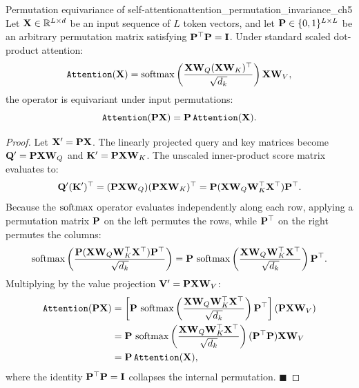 \documentclass[../../../main.tex]{subfiles}
\begin{document}
\begin{theorem}{Permutation equivariance of self-attention}{attention_permutation_invariance_ch5}
Let $\mathbf{X} \in \mathbb{R}^{L \times d}$ be an input sequence of $L$ token vectors, and let $\mathbf{P} \in \{0, 1\}^{L \times L}$ be an arbitrary permutation matrix satisfying $\mathbf{P}^\top \mathbf{P} = \mathbf{I}$. Under standard scaled dot-product attention:
\begin{equation}
\label{eq:standard_attention_op_ch5}
\text{\texttt{Attention}}(\mathbf{X}) = \operatorname{\mathrm{softmax}}\left(\frac{\mathbf{X} \mathbf{W}_Q (\mathbf{X} \mathbf{W}_K)^\top}{\sqrt{d_k}}\right) \mathbf{X} \mathbf{W}_V,
\end{equation}
the operator is equivariant under input permutations:
\begin{equation}
\label{eq:attention_permutation_proof_ch5}
\text{\texttt{Attention}}(\mathbf{P} \mathbf{X}) = \mathbf{P} \, \text{\texttt{Attention}}(\mathbf{X}).
\end{equation}
\end{theorem}
\begin{proof}
Let $\mathbf{X}' = \mathbf{P} \mathbf{X}$. The linearly projected query and key matrices become $\mathbf{Q}' = \mathbf{P} \mathbf{X} \mathbf{W}_Q$ and $\mathbf{K}' = \mathbf{P} \mathbf{X} \mathbf{W}_K$. The unscaled inner-product score matrix evaluates to:
\begin{equation}
\mathbf{Q}' (\mathbf{K}')^\top = (\mathbf{P} \mathbf{X} \mathbf{W}_Q) (\mathbf{P} \mathbf{X} \mathbf{W}_K)^\top = \mathbf{P} (\mathbf{X} \mathbf{W}_Q \mathbf{W}_K^\top \mathbf{X}^\top) \mathbf{P}^\top.
\end{equation}
Because the $\operatorname{\mathrm{softmax}}$ operator evaluates independently along each row, applying a permutation matrix $\mathbf{P}$ on the left permutes the rows, while $\mathbf{P}^\top$ on the right permutes the columns:
\begin{equation}
\operatorname{\mathrm{softmax}}\left(\frac{\mathbf{P} (\mathbf{X} \mathbf{W}_Q \mathbf{W}_K^\top \mathbf{X}^\top) \mathbf{P}^\top}{\sqrt{d_k}}\right) = \mathbf{P} \, \operatorname{\mathrm{softmax}}\left(\frac{\mathbf{X} \mathbf{W}_Q \mathbf{W}_K^\top \mathbf{X}^\top}{\sqrt{d_k}}\right) \mathbf{P}^\top.
\end{equation}
Multiplying by the value projection $\mathbf{V}' = \mathbf{P} \mathbf{X} \mathbf{W}_V$:
\begin{align}
\text{\texttt{Attention}}(\mathbf{P} \mathbf{X}) &= \left[ \mathbf{P} \, \operatorname{\mathrm{softmax}}\left(\frac{\mathbf{X} \mathbf{W}_Q \mathbf{W}_K^\top \mathbf{X}^\top}{\sqrt{d_k}}\right) \mathbf{P}^\top \right] (\mathbf{P} \mathbf{X} \mathbf{W}_V) \nonumber \\
&= \mathbf{P} \, \operatorname{\mathrm{softmax}}\left(\frac{\mathbf{X} \mathbf{W}_Q \mathbf{W}_K^\top \mathbf{X}^\top}{\sqrt{d_k}}\right) (\mathbf{P}^\top \mathbf{P}) \mathbf{X} \mathbf{W}_V \nonumber \\
&= \mathbf{P} \, \text{\texttt{Attention}}(\mathbf{X}),
\end{align}
where the identity $\mathbf{P}^\top \mathbf{P} = \mathbf{I}$ collapses the internal permutation. $\blacksquare$
\end{proof}
\end{document}
